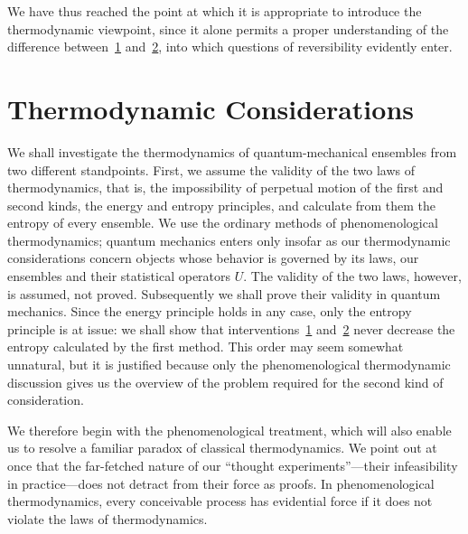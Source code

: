 \documentclass[fontsize=13pt,twoside,openany,headings=normal,parskip=false,bookmarkpackage=false,DIV=calc]{scrbook}
\begin{document}
We have thus reached the point at which it is appropriate to introduce the thermodynamic viewpoint, since it alone permits a proper understanding of the difference between~\hyperref[eq:V.1.1]{1} and~\hyperref[eq:V.1.2]{2}, into which questions of reversibility evidently enter.

\section{Thermodynamic Considerations}\label{sec:V.2}
We shall investigate the thermodynamics of quantum-mechanical ensembles from two different standpoints. First, we assume the validity of the two laws of thermodynamics, that is, the impossibility of perpetual motion of the first and second kinds, the energy and entropy principles, and calculate from them the entropy of every ensemble. We use the ordinary methods of phenomenological thermodynamics; quantum mechanics enters only insofar as our thermodynamic considerations concern objects whose behavior is governed by its laws, our ensembles and their statistical operators $U$. The validity of the two laws, however, is assumed, not proved. Subsequently we shall prove their validity in quantum mechanics. Since the energy principle holds in any case, only the entropy principle is at issue: we shall show that interventions~\hyperref[eq:V.1.1]{1} and~\hyperref[eq:V.1.2]{2} never decrease the entropy calculated by the first method. This order may seem somewhat unnatural, but it is justified because only the phenomenological thermodynamic discussion gives us the overview of the problem required for the second kind of consideration.

We therefore begin with the phenomenological treatment, which will also enable us to resolve a familiar paradox of classical thermodynamics. We point out at once that the far-fetched nature of our ``thought experiments''---their infeasibility in practice---does not detract
\hypertarget{origpage-192}{}%
from their force as proofs. In phenomenological thermodynamics, every conceivable process has evidential force if it does not violate the laws of thermodynamics.
\end{document}

